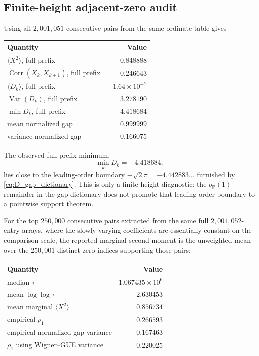 \documentclass[pdflatex,sn-mathphys-num]{sn-jnl}
\numberwithin{equation}{section}
\theoremstyle{thmstyleone}
\theoremstyle{thmstylethree}
\theoremstyle{thmstyletwo}
\newcommand{\Var}{\operatorname{Var}}
\newcommand{\Corr}{\operatorname{Corr}}
\newcommand{\1}{\mathbf 1}
\newcommand{\Prob}{\mathbb P}
\begin{document}
\subsection{Finite-height adjacent-zero audit}
\label{subsec:adjacent_numerics}

Using all $2{,}001{,}051$ consecutive pairs from the same ordinate table gives
\begin{center}
\begin{tabular}{@{}lr@{}}
\toprule
Quantity & Value\\
\midrule
$\langle X^2\rangle$, full prefix & $0.848888$\\
$\Corr(X_k,X_{k+1})$, full prefix & $0.246643$\\
$\langle D_k\rangle$, full prefix & $-1.64\times10^{-7}$\\
$\Var(D_k)$, full prefix & $3.278190$\\
$\min D_k$, full prefix & $-4.418684$\\
mean normalized gap & $0.999999$\\
variance normalized gap & $0.166075$\\
\bottomrule
\end{tabular}
\end{center}
The observed full-prefix minimum,
\[
 \min_k D_k=-4.418684,
\]
lies close to the leading-order boundary
\(-\sqrt2\pi=-4.442883\ldots\) furnished by
\eqref{eq:D_gap_dictionary}.  This is only a finite-height diagnostic: the
\(o_{\Prob}(1)\) remainder in the gap dictionary does not promote that
leading-order boundary to a pointwise support theorem.

For the top $250{,}000$ consecutive pairs extracted from the same full $2{,}001{,}052$-entry arrays, where the slowly varying coefficients are essentially
constant on the comparison scale, the reported marginal second moment is the
unweighted mean over the $250{,}001$ distinct zero indices supporting those
pairs:
\begin{center}
\begin{tabular}{@{}lr@{}}
\toprule
Quantity & Value\\
\midrule
median $\tau$ & $1.067435\times10^6$\\
mean $\log\log\tau$ & $2.630453$\\
mean marginal $\langle X^2\rangle$ & $0.856734$\\
empirical $\rho_1$ & $0.266593$\\
empirical normalized-gap variance & $0.167463$\\
$\rho_1$ using Wigner--GUE variance & $0.220025$\\
\bottomrule
\end{tabular}
\end{center}
\end{document}
